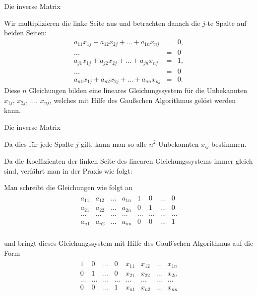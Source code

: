 \documentclass[german]{beamer}
\newcommand{\bq}{\begin{eqnarray*}}
\newcommand{\eq}{\end{eqnarray*}}
\begin{document}
\begin{frame}{Die inverse Matrix}

Wir multiplizieren die linke Seite aus und betrachten danach die $j$-te Spalte auf beiden Seiten:
\bq
a_{11} x_{1j} + a_{12} x_{2j} + ... + a_{1n} x_{nj} & = & 0, 
 \nonumber \\
 ... & = & 0
 \nonumber \\
a_{j1} x_{1j} + a_{j2} x_{2j} + ... + a_{jn} x_{nj} & = & 1, 
 \nonumber \\
 ... & = & 0
 \nonumber \\
a_{n1} x_{1j} + a_{n2} x_{2j} + ... + a_{nn} x_{nj} & = & 0.
\eq
Diese $n$ Gleichungen bilden eine lineares Gleichungssystem f\"ur die Unbekannten $x_{1j}$, $x_{2j}$, ..., $x_{nj}$,
welches mit Hilfe des Gau{\ss}schen Algorithmus gel\"ost werden kann.

\end{frame}

\begin{frame}{Die inverse Matrix}

Da dies f\"ur jede Spalte $j$ gilt, kann man so alle $n^2$ Unbekannten $x_{ij}$ bestimmen.

Da die Koeffizienten der linken Seite des linearen Gleichungssystems immer gleich sind, verf\"ahrt man in der Praxis wie
folgt:

Man schreibt die Gleichungen wie folgt an
{\small
\bq
\begin{array}{cccc|cccc}
 a_{11} & a_{12} & ... & a_{1n} & 1 & 0 & ... & 0 \\
 a_{21} & a_{22} & ... & a_{2n} & 0 & 1 & ... & 0 \\
 ...    & ...    & ... & ...    & ... & ... & ... & ... \\
 a_{n1} & a_{n2} & ... & a_{nn} & 0 & 0 & ... & 1 \\
\end{array}
\eq
}

und bringt dieses Gleichungssystem mit Hilfe des Gau{\ss}'schen Algorithmus auf die Form
{\small
\bq
\begin{array}{cccc|cccc}
 1 & 0 & ... & 0 & x_{11} & x_{12} & ... & x_{1n} \\
 0 & 1 & ... & 0 & x_{21} & x_{22} & ... & x_{2n} \\
 ... & ... & ... & ... & ...    & ...    & ... & ...    \\
 0 & 0 & ... & 1 & x_{n1} & x_{n2} & ... & x_{nn} \\
\end{array} 
\eq
}

\end{frame}
\end{document}

